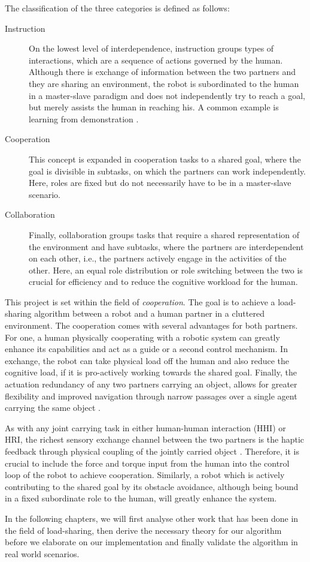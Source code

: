 The classification of the three categories is defined as follows:

\begin{description}
\item[Instruction] On the lowest level of interdependence, instruction groups types of interactions, which are a sequence of actions governed by the human. Although there is exchange of information between the two partners and they are sharing an environment, the robot is subordinated to the human in a master-slave paradigm and does not independently try to reach a goal, but merely assists the human in reaching his. A common example is learning from demonstration \citep{argall2009survey}.

\item[Cooperation] This concept is expanded in cooperation tasks to a shared goal, where the goal is divisible in subtasks, on which the partners can work independently. Here, roles are fixed but do not necessarily have to be in a master-slave scenario.

\item[Collaboration] Finally, collaboration groups tasks that require a shared representation of the environment and have subtasks, where the partners are interdependent on each other, i.e., the partners actively engage in the activities of the other. Here, an equal role distribution or role switching between the two is crucial for efficiency and to reduce the cognitive workload for the human.
\end{description}

This project is set within the field of \emph{cooperation}. The goal is to achieve a load-sharing algorithm between a robot and a human partner in a cluttered environment. The cooperation comes with several advantages for both partners. For one, a human physically cooperating with a robotic system can greatly enhance its capabilities and act as a guide or a second control mechanism. In exchange, the robot can take physical load off the human and also reduce the cognitive load, if it is pro-actively 
working towards the shared goal. Finally, the actuation redundancy of any two partners carrying an object, allows for greater flexibility and improved navigation through narrow passages over a single agent carrying the same object \citep{reed2008physical}.

As with any joint carrying task in either human-human interaction (HHI) or HRI, the richest sensory exchange channel between the two partners is the haptic feedback through physical coupling of the jointly carried object \citep{reed2006haptic}. Therefore, it is crucial to include the force and torque input from the human into the control loop of the robot to achieve cooperation. Similarly, a robot which is actively contributing to the shared goal by its obstacle avoidance, although being bound in a fixed subordinate role to the human, will greatly enhance the system.

In the following chapters, we will first analyse other work that has been done in the field of load-sharing, then derive the necessary theory for our algorithm before we elaborate on our implementation and finally validate the algorithm in real world scenarios.
